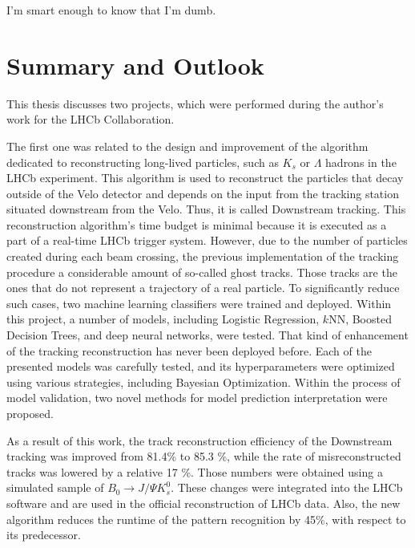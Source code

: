 \begin{savequote}[75mm] 
I'm smart enough to know that I'm dumb.

\end{savequote}

\chapter{Summary and Outlook}

This thesis discusses two projects, which were performed during the author's work for the LHCb Collaboration. 

The first one was related to the design and improvement of the algorithm dedicated to reconstructing long-lived particles, such as $K_{s}$ or $\Lambda$ hadrons in the LHCb experiment. This algorithm is used to reconstruct the particles that decay outside of the Velo detector and depends on the input from the tracking station situated downstream from the Velo. Thus, it is called Downstream tracking. This reconstruction algorithm's time budget is minimal because it is executed as a part of a real-time LHCb trigger system.  However, due to the number of particles created during each beam crossing, the previous implementation of the tracking procedure a considerable amount of so-called ghost tracks. Those tracks are the ones that do not represent a trajectory of a real particle. To significantly reduce such cases, two machine learning classifiers were trained and deployed. 
Within this project, a number of models, including Logistic Regression, $k$NN, Boosted Decision Trees, and deep neural networks, were tested.
That kind of enhancement of the tracking reconstruction has never been deployed before. 
Each of the presented models was carefully tested, and its hyperparameters were optimized using various strategies, including Bayesian Optimization. Within the process of model validation, two novel methods for model prediction interpretation were proposed. 

As a result of this work, the track reconstruction efficiency of the Downstream tracking was improved from 81.4\% to 85.3 \%, while the rate of misreconstructed tracks was lowered by a relative 17 \%. Those numbers were obtained using a simulated sample of  $B_0 \rightarrow J/\Psi K^{0}_{s}$. 
These changes were integrated into the LHCb software and are used in the official reconstruction of LHCb data. Also, the new algorithm reduces the runtime of the pattern recognition by 45\%, with respect to its predecessor.  

